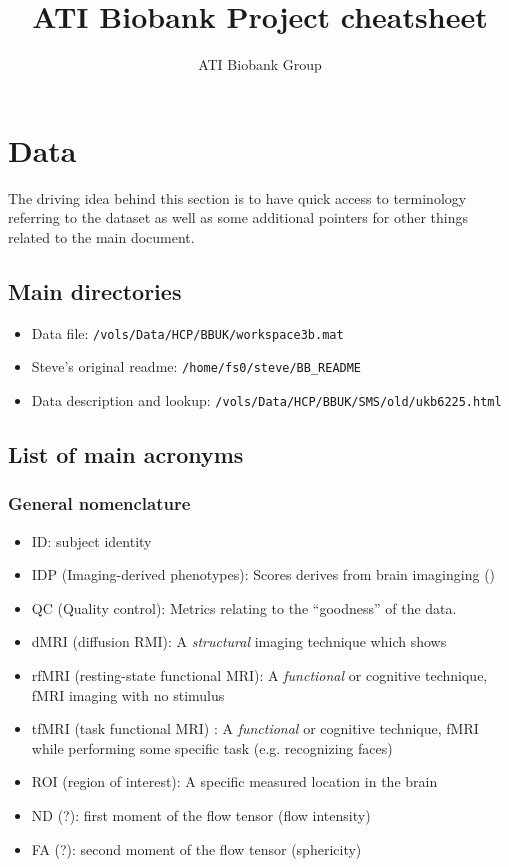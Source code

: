 \documentclass{article}
\begin{document}
\title{ATI Biobank Project cheatsheet}

\author{ATI Biobank Group}

\maketitle

\section{Data\label{sec:data}}
The driving idea behind this section is to have quick access to terminology referring to the dataset as well as some additional pointers for other things related to the main document.

\subsection{Main directories\label{sec:data-dir}}

\begin{itemize}
\item Data file: {\tt /vols/Data/HCP/BBUK/workspace3b.mat}
\item Steve's original readme: {\tt /home/fs0/steve/BB\_README}
\item Data description and lookup: {\tt /vols/Data/HCP/BBUK/SMS/old/ukb6225.html}
\end{itemize}

\subsection{List of main acronyms\label{sec:data-acro}}

\subsubsection{General nomenclature}
\begin{itemize}
\item ID: subject identity
\item IDP (Imaging-derived phenotypes): Scores derives from brain imaginging ()
\item QC (Quality control): Metrics relating to the ``goodness'' of the data.
\item dMRI (diffusion RMI): A \emph{structural} imaging technique which shows
\item rfMRI (resting-state functional MRI): A \emph{functional} or cognitive technique, fMRI imaging with no stimulus
\item tfMRI (task functional MRI) : A \emph{functional} or cognitive technique, fMRI while performing some specific task (e.g. recognizing faces)
\item ROI (region of interest): A specific measured location in the brain
\item ND (?): first moment of the flow tensor (flow intensity)
\item FA (?): second moment of the flow tensor (sphericity)
\end{itemize}
\end{document}
